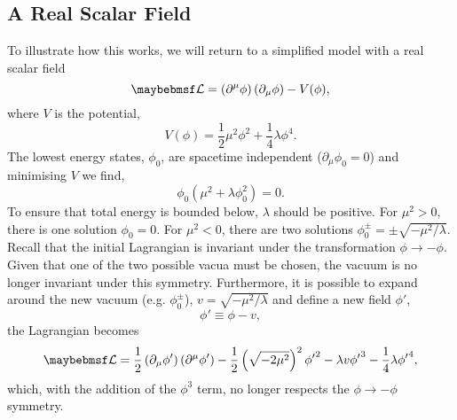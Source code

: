 \subsection{A Real Scalar Field}
To illustrate how this works, we will return to a simplified model with a real
scalar field
\begin{equation*}
\lagrangiand = \left(\partial^{\mu}\phi\right)\left(\partial_{\mu}\phi\right)
-V(\phi),
\end{equation*}
where $V$ is the potential,
\begin{equation*}
V(\phi) = \frac{1}{2}\mu^2\phi^2 + \frac{1}{4}\lambda\phi^4.
\end{equation*}
The lowest energy states, $\phi_0$, are spacetime independent ($\partial_{\mu}
\phi_0 = 0$) and minimising $V$ we find,
\begin{equation*}
\phi_0 \left (\mu^2 + \lambda\phi_0^2\right) = 0.
\end{equation*}
To ensure that total energy is bounded below, $\lambda$ should be positive. For
$\mu^2 > 0$, there is one solution $\phi_0 = 0$. For $\mu^2 < 0$, there are two
solutions $\phi^\pm_0 = \pm \sqrt{-\mu^2/\lambda}$. Recall that the initial
Lagrangian is invariant under the transformation $\phi \longrightarrow
-\phi$. Given that one of the two possible vacua must be chosen, the vacuum is
no longer invariant under this symmetry. Furthermore, it is possible to expand
around the new vacuum (e.g. $\phi_0^\pm$), $v=\sqrt{-\mu^2/\lambda}$ and define
a new field $\phi'$,
\begin{equation*}
\phi' \equiv \phi - v,
\end{equation*}
the Lagrangian becomes
\begin{equation*}
\lagrangiand = \frac{1}{2}
\left(\partial_{\mu}\phi'\right)\left(\partial^{\mu}\phi'\right)
-\frac{1}{2}\left(\sqrt{-2\mu^2}\right)^2{\phi'}^2 - \lambda v {\phi'}^3
-\frac{1}{4}\lambda{\phi'}^4,
\end{equation*}
which, with the addition of the $\phi^3$ term, no longer respects the $\phi
\longrightarrow -\phi$ symmetry.

